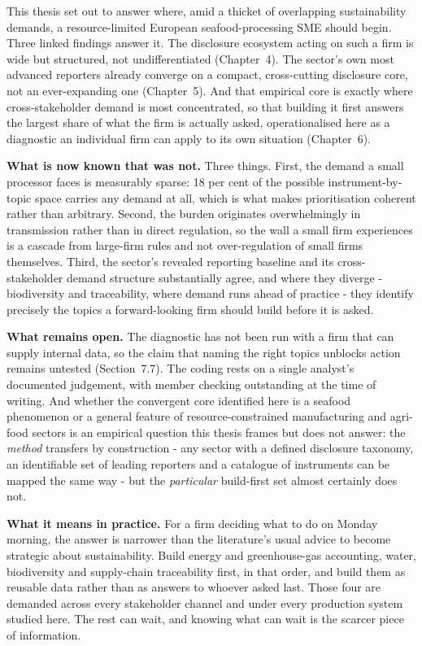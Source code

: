 \documentclass[
]{article}
\begin{document}
This thesis set out to answer where, amid a thicket of overlapping
sustainability demands, a resource-limited European seafood-processing SME
should begin. Three linked findings answer it. The disclosure ecosystem
acting on such a firm is wide but structured, not undifferentiated
(Chapter~4). The sector's own most advanced reporters already converge on a
compact, cross-cutting disclosure core, not an ever-expanding one
(Chapter~5). And that empirical core is exactly where cross-stakeholder demand
is most concentrated, so that building it first answers the largest share of
what the firm is actually asked, operationalised here as a diagnostic an
individual firm can apply to its own situation (Chapter~6).

\textbf{What is now known that was not.} Three things. First, the demand a small
processor faces is measurably sparse: 18 per cent of the possible
instrument-by-topic space carries any demand at all, which is what makes
prioritisation coherent rather than arbitrary. Second, the burden originates
overwhelmingly in transmission rather than in direct regulation, so the wall a
small firm experiences is a cascade from large-firm rules and not
over-regulation of small firms themselves. Third, the sector's revealed reporting
baseline and its cross-stakeholder demand structure substantially agree, and where
they diverge - biodiversity and traceability, where demand runs ahead of practice -
they identify precisely the topics a forward-looking firm should build before it
is asked.

\textbf{What remains open.} The diagnostic has not been run with a firm that can
supply internal data, so the claim that naming the right topics unblocks action
remains untested (Section~7.7). The coding rests on a single analyst's documented
judgement, with member checking outstanding at the time of writing. And whether the
convergent core identified here is a seafood phenomenon or a general feature of
resource-constrained manufacturing and agri-food sectors is an empirical question
this thesis frames but does not answer: the \emph{method} transfers by
construction - any sector with a defined disclosure taxonomy, an identifiable set
of leading reporters and a catalogue of instruments can be mapped the same way -
but the \emph{particular} build-first set almost certainly does not.

\textbf{What it means in practice.} For a firm deciding what to do on Monday
morning, the answer is narrower than the literature's usual advice to become
strategic about sustainability. Build energy and greenhouse-gas accounting, water,
biodiversity and supply-chain traceability first, in that order, and build them as
reusable data rather than as answers to whoever asked last. Those four are demanded
across every stakeholder channel and under every production system studied here.
The rest can wait, and knowing what can wait is the scarcer piece of information.
\end{document}
